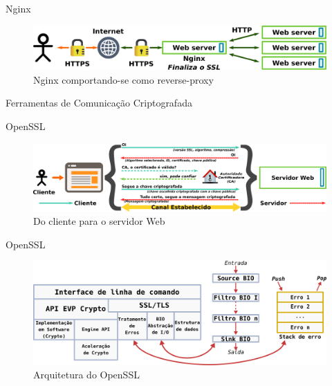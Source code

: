 \documentclass[xcolor={usenames,svgnames,dvipsnames},brazil,english,12pt,aspectratio=149]{beamer}
\begin{document}
\begin{frame}{Nginx}
	\begin{figure}[!h]
		\centering
		\includegraphics[width=\textwidth]{nginx_load_balancer_ex} 
		\caption{Nginx comportando-se como reverse-proxy}
		\label{fig:nginx_basico} 
	\end{figure}
\end{frame}

\begin{frame}{Ferramentas de Comunicação Criptografada}
\end{frame}

\begin{frame}{OpenSSL}
	\begin{figure}[!h]
		\centering
		\includegraphics[width=\textwidth]{ssl_handshake}
		\caption{Do cliente para o servidor Web}
		\label{fig:openssl_handshake}
	\end{figure}
\end{frame}

\begin{frame}{OpenSSL}
	\begin{figure}[!h]
		\centering
		\includegraphics[width=\textwidth]{openssl_arch}
		\caption{Arquitetura do OpenSSL}
		\label{fig:openssl_arch}
	\end{figure}
\end{frame}
\end{document}
